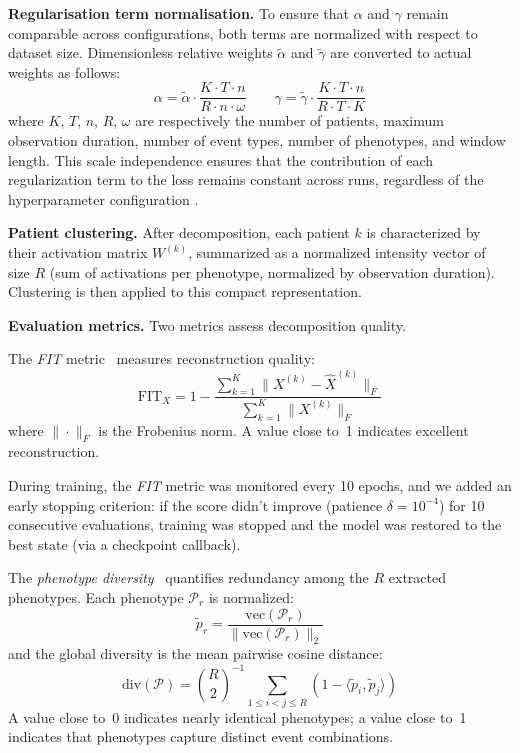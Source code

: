 \documentclass[pdflatex,sn-mathphys-num,referee,lineno]{sn-jnl}
\begin{document}
\textbf{Regularisation term normalisation.}
To ensure that $\alpha$ and $\gamma$ remain comparable across configurations, both terms are normalized with respect to dataset size.
Dimensionless relative weights $\tilde{\alpha}$ and $\tilde{\gamma}$ are converted to actual weights as follows:
\begin{equation}
  \alpha = \tilde{\alpha} \cdot \frac{K \cdot T \cdot n}{R \cdot n \cdot \omega}
  \qquad
  \gamma = \tilde{\gamma} \cdot \frac{K \cdot T \cdot n}{R \cdot T \cdot K}
  \label{eq:normalized_reg}
\end{equation}
where $K$, $T$, $n$, $R$, $\omega$ are respectively the number of patients, maximum observation duration, number of event types, number of phenotypes, and window length.
This scale independence ensures that the contribution of each regularization term to the loss remains constant across runs, regardless of the hyperparameter configuration \citep{sebia2024swotted}.

\textbf{Patient clustering.}
After decomposition, each patient $k$ is characterized by their activation matrix $W^{(k)}$, summarized as a normalized intensity vector of size $R$ (sum of activations per phenotype, normalized by observation duration).
Clustering is then applied to this compact representation.

\textbf{Evaluation metrics.}
Two metrics assess decomposition quality.

The \emph{FIT} metric~\cite{sebia2024swotted,Afshar2018} measures reconstruction quality:
\begin{equation}
  \text{FIT}_X = 1 - \frac{\sum_{k=1}^K \| X^{(k)} - \widehat{X}^{(k)} \|_F}
  {\sum_{k=1}^K \| X^{(k)} \|_F}
  \label{eq:fit}
\end{equation}
where $\|\cdot\|_F$ is the Frobenius norm.
A value close to~1 indicates excellent reconstruction.

During training, the \emph{FIT} metric was monitored every 10 epochs, and we added an early stopping criterion: if the score didn't improve (patience $\delta = 10^{-4}$) for 10 consecutive evaluations, training was stopped and the model was restored to the best state (via a checkpoint callback).

The \emph{phenotype diversity}~\cite{sebia2024swotted} quantifies redundancy among the $R$ extracted phenotypes.
Each phenotype $\mathcal{P}_r$ is normalized:
\begin{equation}
  \tilde{p}_r = \frac{\mathrm{vec}(\mathcal{P}_r)}
  {\|\mathrm{vec}(\mathcal{P}_r)\|_2}
  \label{eq:normalisation}
\end{equation}
and the global diversity is the mean pairwise cosine distance:
\begin{equation}
  \mathrm{div}(\mathcal{P}) = \binom{R}{2}^{-1}
  \sum_{1 \leq i < j \leq R}\left(1 - \langle \tilde{p}_i, \tilde{p}_j \rangle\right)
  \label{eq:div_globale}
\end{equation}
A value close to~0 indicates nearly identical phenotypes; a value close to~1 indicates that phenotypes capture distinct event combinations.
\end{document}
